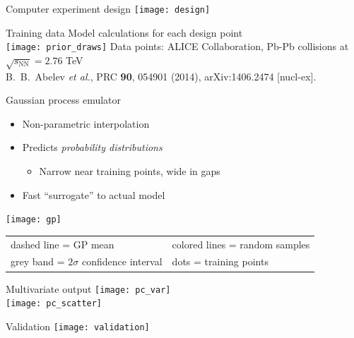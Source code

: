 \documentclass{beamer}
\begin{document}
\begin{frame}{Computer experiment design}
  \centering
  \texttt{[image: design]}
\end{frame}


\begin{frame}{Training data}
  \centering
  Model calculations for each design point \\
  \bigskip
  \texttt{[image: prior\_draws]}
  \flushright
  \tiny
  Data points: ALICE Collaboration, Pb-Pb collisions at $\sqrt{s_\text{NN}} = 2.76$ TeV \\
  B.~B.~Abelev {\it et al.}, PRC {\bf 90}, 054901 (2014), arXiv:1406.2474 [nucl-ex].
\end{frame}


\begin{frame}{Gaussian process emulator}
  \vspace{1ex}
  \begin{itemize}
    \item Non-parametric interpolation
    \item Predicts \emph{probability distributions}
      \begin{itemize}
        \item Narrow near training points, wide in gaps
      \end{itemize}
    \item Fast ``surrogate'' to actual model
  \end{itemize}
  \medskip
  \centering
  \texttt{[image: gp]}
  \flushright
  \footnotesize
  \begin{tabular}{ll}
    dashed line = GP mean &
    colored lines = random samples \\
    grey band = $2\sigma$ confidence interval &
    dots = training points
  \end{tabular}
\end{frame}


\begin{frame}{Multivariate output}
  \centering
  \texttt{[image: pc\_var]} \\
  \texttt{[image: pc\_scatter]}
\end{frame}


\begin{frame}{Validation}
  \centering
  \texttt{[image: validation]}
\end{frame}
\end{document}
